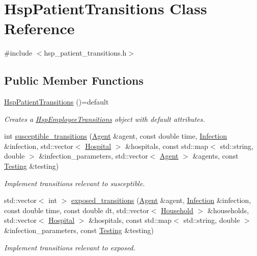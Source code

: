 \hypertarget{classHspPatientTransitions}{}\section{Hsp\+Patient\+Transitions Class Reference}
\label{classHspPatientTransitions}


{\ttfamily \#include $<$hsp\+\_\+patient\+\_\+transitions.\+h$>$}

\subsection*{Public Member Functions}
\begin{DoxyCompactItemize}
\item 
\hyperlink{classHspPatientTransitions_ac340b64447c30fd3e22f17a0f3009f0f}{Hsp\+Patient\+Transitions} ()=default
\begin{DoxyCompactList}\small\item\em Creates a \hyperlink{classHspEmployeeTransitions}{Hsp\+Employee\+Transitions} object with default attributes. \end{DoxyCompactList}\item 
int \hyperlink{classHspPatientTransitions_aaa062d18f7667c56f54de552f9641b8d}{susceptible\+\_\+transitions} (\hyperlink{classAgent}{Agent} \&agent, const double time, \hyperlink{classInfection}{Infection} \&infection, std\+::vector$<$ \hyperlink{classHospital}{Hospital} $>$ \&hospitals, const std\+::map$<$ std\+::string, double $>$ \&infection\+\_\+parameters, std\+::vector$<$ \hyperlink{classAgent}{Agent} $>$ \&agents, const \hyperlink{classTesting}{Testing} \&testing)
\begin{DoxyCompactList}\small\item\em Implement transitions relevant to susceptible. \end{DoxyCompactList}\item 
std\+::vector$<$ int $>$ \hyperlink{classHspPatientTransitions_a997c4ba7748a8cb62efd0a5ab6c3da9f}{exposed\+\_\+transitions} (\hyperlink{classAgent}{Agent} \&agent, \hyperlink{classInfection}{Infection} \&infection, const double time, const double dt, std\+::vector$<$ \hyperlink{classHousehold}{Household} $>$ \&households, std\+::vector$<$ \hyperlink{classHospital}{Hospital} $>$ \&hospitals, const std\+::map$<$ std\+::string, double $>$ \&infection\+\_\+parameters, const \hyperlink{classTesting}{Testing} \&testing)
\begin{DoxyCompactList}\small\item\em Implement transitions relevant to exposed. \end{DoxyCompactList}\item 

\end{DoxyCompactItemize}

